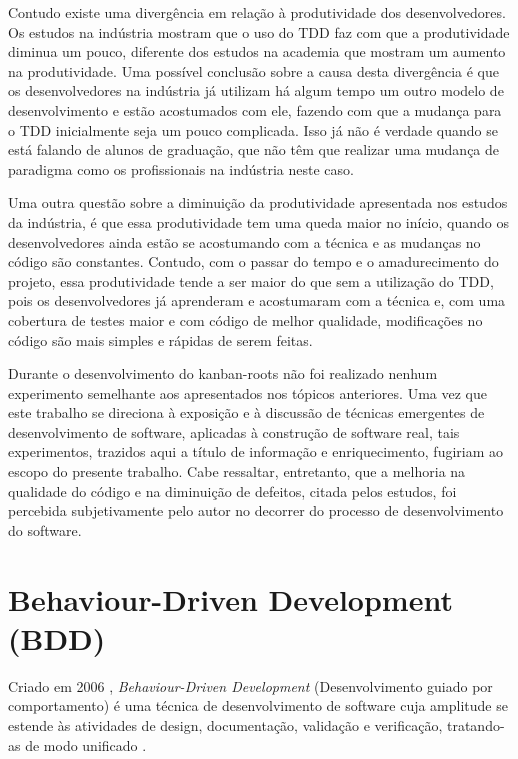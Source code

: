 Contudo existe uma divergência em relação à produtividade dos desenvolvedores. Os estudos na indústria mostram que o uso do TDD faz com que a produtividade diminua um pouco, diferente dos estudos na academia que mostram um aumento na produtividade. Uma possível conclusão sobre a causa desta divergência é que os desenvolvedores na indústria já utilizam há algum tempo um outro modelo de desenvolvimento e estão acostumados com ele, fazendo com que a mudança para o TDD inicialmente seja um pouco complicada. Isso já não é verdade quando se está falando de alunos de graduação, que não têm que realizar uma mudança de paradigma como os profissionais na indústria neste caso.

Uma outra questão sobre a diminuição da produtividade apresentada nos estudos da indústria, é que essa produtividade tem uma queda maior no início, quando os desenvolvedores ainda estão se acostumando com a técnica e as mudanças no código são constantes. Contudo, com o passar do tempo e o amadurecimento do projeto, essa produtividade tende a ser maior do que sem a utilização do TDD, pois os desenvolvedores já aprenderam e acostumaram com a técnica e, com uma cobertura de testes maior e com código de melhor qualidade, modificações no código são mais simples e rápidas de serem feitas.

Durante o desenvolvimento do kanban-roots não foi realizado nenhum experimento semelhante aos apresentados nos tópicos anteriores. Uma vez que este trabalho se direciona à exposição e à discussão de técnicas emergentes de desenvolvimento de software, aplicadas à construção de software real, tais experimentos, trazidos aqui a título de informação e enriquecimento, fugiriam ao escopo do presente trabalho. Cabe ressaltar, entretanto, que a melhoria na qualidade do código e na diminuição de defeitos, citada pelos estudos, foi percebida subjetivamente pelo autor no decorrer do processo de desenvolvimento do software.





\section{Behaviour-Driven Development (BDD)}
\label{sec:bdd}

Criado em 2006 \cite{IntroducingBDD}, \textit{Behaviour-Driven Development} (Desenvolvimento guiado por comportamento) é uma técnica de desenvolvimento de software cuja amplitude se estende às atividades de design, documentação, validação e verificação, tratando-as de modo unificado \cite{BDDRodrigo}.

